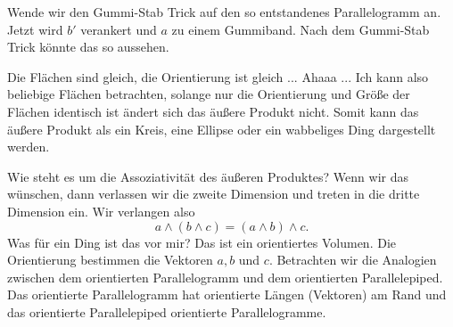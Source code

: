 \documentclass[fleqn]{scrartcl}
\numberwithin{equation}{section}
\begin{document}
Wende wir den Gummi-Stab Trick auf den so entstandenes Parallelogramm an.
Jetzt wird $b'$ verankert und $a$ zu einem Gummiband. Nach dem Gummi-Stab
Trick könnte das so aussehen.
\begin{center}
\begin{minipage}{\linewidth}
\centering
{}
\label{fig:shiftshift}
\end{minipage}
\end{center}

Die Flächen sind gleich, die Orientierung ist gleich ... Ahaaa ... Ich kann
also beliebige Flächen betrachten, solange nur die Orientierung und Größe der
Flächen identisch ist ändert sich das äußere Produkt nicht. Somit kann das
äußere Produkt als ein Kreis, eine Ellipse oder ein wabbeliges Ding
dargestellt werden.

Wie steht es um die Assoziativität des äußeren Produktes? Wenn wir das
wünschen, dann verlassen wir die zweite Dimension und treten in die dritte
Dimension ein. Wir verlangen also
\[a\wedge(b\wedge c) =(a\wedge b)\wedge c.\]
Was für ein Ding ist das vor mir? Das ist ein orientiertes Volumen. Die
Orientierung bestimmen die Vektoren $a, b$ und $c$. Betrachten wir die
Analogien zwischen dem orientierten Parallelogramm und dem orientierten
Parallelepiped. Das orientierte Parallelogramm hat orientierte Längen
(Vektoren) am Rand und das orientierte Parallelepiped orientierte
Parallelogramme.
\end{document}
